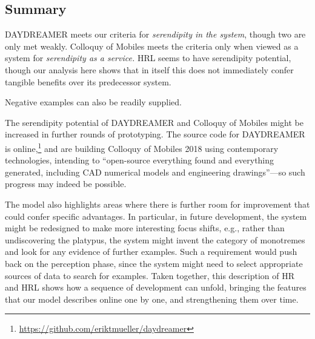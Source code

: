 \subsection{Summary}
{\sf DAYDREAMER} meets our criteria for \emph{serendipity in the
  system}, though two are only met weakly.  {\sf Colloquy of Mobiles}
meets the criteria only when viewed as a system for \emph{serendipity
  as a service.}  {\sf HRL} seems to have serendipity potential,
though our analysis here shows that in itself this does not
immediately confer tangible benefits over its predecessor system.

Negative examples can also be readily supplied.

The serendipity potential of {\sf DAYDREAMER} and {\sf Colloquy of
  Mobiles} might be increased in further rounds of prototyping.
The source code for {\sf DAYDREAMER} is
online,\footnote{\url{https://github.com/eriktmueller/daydreamer}} and
\citet{pangaro2018serendipity} are building {\sf Colloquy of Mobiles
  2018} using contemporary technologies, intending to ``open-source
everything found and everything generated, including CAD numerical
models and engineering drawings''---so such progress may indeed be
possible.
 
The model also highlights areas where there is further room for improvement
that could confer specific advantages.
In particular, in future development, the system might be redesigned to make more
interesting focus shifts, e.g., rather than undiscovering the
platypus, the system might invent the category of monotremes and look
for any evidence of further examples.  Such a requirement would push
back on the perception phase, since the system might need to select
appropriate sources of data to search for examples.  Taken together,
this description of {\sf HR} and {\sf HRL} shows how a sequence of
development can unfold, bringing the features that our model
describes online one by one, and strengthening them over time.


